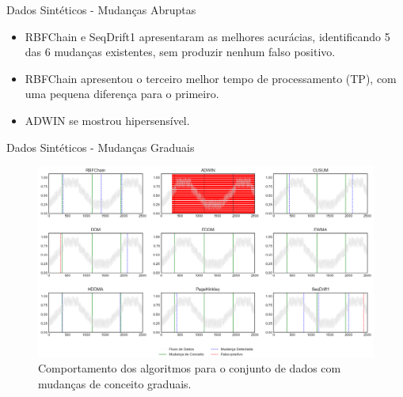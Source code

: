 \documentclass[10pt]{beamer}
\begin{document}
\begin{frame}{Dados Sintéticos -  Mudanças Abruptas}
    \begin{itemize}
        \item RBFChain e SeqDrift1 apresentaram as melhores acurácias, identificando 5 das 6 mudanças existentes, sem produzir nenhum falso positivo.
        \item RBFChain apresentou o terceiro melhor tempo de processamento (TP), com uma pequena diferença para o primeiro.
        \item ADWIN se mostrou hipersensível.
    \end{itemize}
\end{frame}

\begin{frame}{Dados Sintéticos -  Mudanças Graduais}
    \begin{figure}[t]
        \begin{center}
            \includegraphics[width=\textwidth]{imagens/gradual.png}
            \caption{Comportamento dos algoritmos para o conjunto de dados com mudanças de conceito graduais.}
            \label{fig:exp_gradual}
        \end{center}
    \end{figure}
\end{frame}
\end{document}
